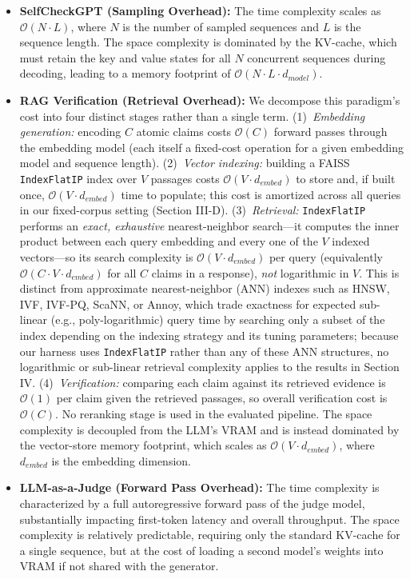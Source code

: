 \documentclass[conference]{IEEEtran}
\begin{document}
\begin{itemize}
    \item \textbf{SelfCheckGPT (Sampling Overhead):} The time complexity scales as $\mathcal{O}(N \cdot L)$, where $N$ is the number of sampled sequences and $L$ is the sequence length. The space complexity is dominated by the KV-cache, which must retain the key and value states for all $N$ concurrent sequences during decoding, leading to a memory footprint of $\mathcal{O}(N \cdot L \cdot d_{model})$.
    \item \textbf{RAG Verification (Retrieval Overhead):} We decompose this paradigm's cost into four distinct stages rather than a single term. (1)~\emph{Embedding generation:} encoding $C$ atomic claims costs $\mathcal{O}(C)$ forward passes through the embedding model (each itself a fixed-cost operation for a given embedding model and sequence length). (2)~\emph{Vector indexing:} building a FAISS \texttt{IndexFlatIP} index over $V$ passages costs $\mathcal{O}(V \cdot d_{embed})$ to store and, if built once, $\mathcal{O}(V \cdot d_{embed})$ time to populate; this cost is amortized across all queries in our fixed-corpus setting (Section III-D). (3)~\emph{Retrieval:} \texttt{IndexFlatIP} performs an \emph{exact, exhaustive} nearest-neighbor search---it computes the inner product between each query embedding and every one of the $V$ indexed vectors---so its search complexity is $\mathcal{O}(V \cdot d_{embed})$ per query (equivalently $\mathcal{O}(C \cdot V \cdot d_{embed})$ for all $C$ claims in a response), \emph{not} logarithmic in $V$. This is distinct from approximate nearest-neighbor (ANN) indexes such as HNSW, IVF, IVF-PQ, ScaNN, or Annoy, which trade exactness for expected sub-linear (e.g., poly-logarithmic) query time by searching only a subset of the index depending on the indexing strategy and its tuning parameters; because our harness uses \texttt{IndexFlatIP} rather than any of these ANN structures, no logarithmic or sub-linear retrieval complexity applies to the results in Section IV. (4)~\emph{Verification:} comparing each claim against its retrieved evidence is $\mathcal{O}(1)$ per claim given the retrieved passages, so overall verification cost is $\mathcal{O}(C)$. No reranking stage is used in the evaluated pipeline. The space complexity is decoupled from the LLM's VRAM and is instead dominated by the vector-store memory footprint, which scales as $\mathcal{O}(V \cdot d_{embed})$, where $d_{embed}$ is the embedding dimension.
    \item \textbf{LLM-as-a-Judge (Forward Pass Overhead):} The time complexity is characterized by a full autoregressive forward pass of the judge model, substantially impacting first-token latency and overall throughput. The space complexity is relatively predictable, requiring only the standard KV-cache for a single sequence, but at the cost of loading a second model's weights into VRAM if not shared with the generator.
\end{itemize}
\end{document}
